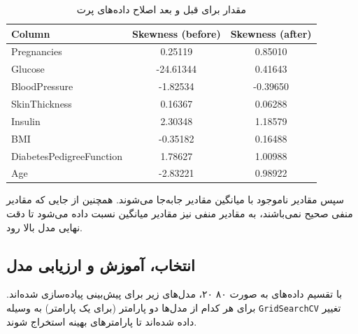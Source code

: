 \documentclass[11pt]{article}
\begin{document}
	\begin{table}[h!]
		\centering
		\caption{مقدار  برای قبل و بعد اصلاح داده‌های پرت}
		\begin{latin}
			{\scriptsize
				\begin{tabular}{lcc}
					\toprule
					Column                     & Skewness (before) & Skewness (after)     \\ 
					\midrule
					Pregnancies                & 0.25119            & 0.85010  \\ 
					Glucose                    & -24.61344            & 0.41643  \\ 
					BloodPressure              & -1.82534             & -0.39650  \\ 
					SkinThickness              & 0.16367            & 0.06288  \\ 
					Insulin                    & 2.30348             & 1.18579  \\ 
					BMI                        & -0.35182             & 0.16488  \\ 
					DiabetesPedigreeFunction   & 1.78627            & 1.00988  \\ 
					Age                        & -2.83221            & 0.98922  \\
					\bottomrule
				\end{tabular}
			}
		\end{latin}
		\label{tab:skewness}
	\end{table}
	سپس مقادیر ناموجود با میانگین مقادیر جابه‌جا می‌شوند. همچنین از جایی که مقادیر منفی صحیح نمی‌باشند، به مقادیر منفی نیز مقادیر میانگین نسبت داده می‌شود تا دقت نهایی مدل بالا رود.\\
	\clearpage
	\subsection{انتخاب، آموزش و ارزیابی مدل}
	با تقسیم داده‌های به صورت ۸۰ ۲۰، مدل‌های زیر برای پیش‌بینی پیاده‌سازی شده‌اند. برای هر کدام از مدل‌ها دو پارامتر (برای  یک پارامتر) به وسیله 
	\verb|GridSearchCV|
	تغییر داده شده‌اند تا پارامتر‌های بهینه استخراج شوند.
\end{document}
